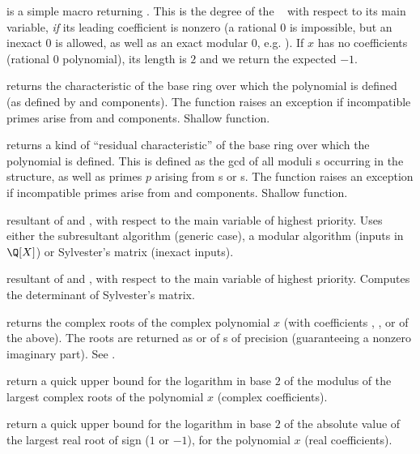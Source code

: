  is a simple macro returning .
This is the degree of the ~ with respect to its main
variable, \emph{if} its leading coefficient is nonzero (a rational $0$ is
impossible, but an inexact $0$ is allowed, as well as an exact modular $0$,
e.g. ). If $x$ has no coefficients (rational $0$ polynomial),
its length is $2$ and we return the expected $-1$.

 returns the characteristic of the
base ring over which the polynomial is defined (as defined by 
and  components). The function raises an exception if incompatible
primes arise from  and  components. Shallow function.

 returns a kind of ``residual
characteristic'' of the base ring over which the polynomial is defined. This
is defined as the gcd of all moduli s occurring in the structure,
as well as primes $p$ arising from s or s. The function
raises an exception if incompatible primes arise from  and
 components. Shallow function.

 resultant of  and , with
respect to the main variable of highest priority. Uses either the
subresultant algorithm (generic case), a modular algorithm (inputs in
$\Q[X]$) or Sylvester's matrix (inexact inputs).

 resultant of  and , with
respect to the main variable of highest priority. Computes the determinant
of Sylvester's matrix.

 returns the complex roots of
the complex polynomial $x$ (with coefficients , ,
 or  of the above). The roots are returned
as  or  of s of precision 
(guaranteeing a nonzero imaginary part). See .

 return a quick upper bound for the
logarithm in base $2$ of the modulus of the largest complex roots of
the polynomial $x$ (complex coefficients).

 return a quick upper
bound for the logarithm in base $2$ of the absolute value of the largest
real root of sign  ($1$ or $-1$), for the polynomial $x$ (real
coefficients).

